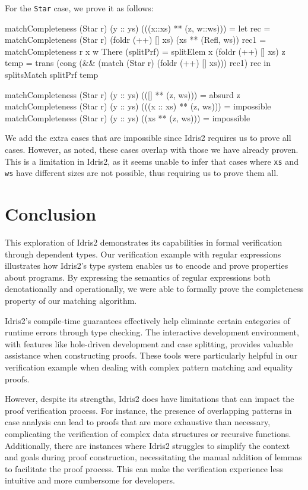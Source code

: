 \documentclass[]{rptuseminar}
\begin{document}
For the \texttt{Star} case, we prove it as follows:

\begin{idris}
matchCompleteness (Star r) (y :: ys) (((x::xs) ** (z, w::ws))) = 
    let rec = matchCompleteness (Star r) (foldr (++) [] xs) (xs ** (Refl, ws))
        rec1 = matchCompleteness r x w
        There (splitPrf) = splitElem x (foldr (++) [] xs) z
        temp = trans (cong (&& (match (Star r) (foldr (++) [] xs))) rec1) rec
    in splitsMatch splitPrf temp 

matchCompleteness (Star r) (y :: ys) (([] ** (z, ws))) = absurd z
matchCompleteness (Star r) (y :: ys) (((x :: xs) ** (z, ws))) = impossible
matchCompleteness (Star r) (y :: ys) ((xs ** (z, ws))) = impossible
\end{idris}

We add the extra cases that are impossible since Idris2 requires us to prove all cases. However, as noted, these cases overlap with those we have already proven. This is a limitation in Idris2, as it seems unable to infer that cases where \texttt{xs} and \texttt{ws} have different sizes are not possible, thus requiring us to prove them all.

\section{Conclusion}  
\label{sec:conclusion}  

This exploration of Idris2 demonstrates its capabilities in formal verification through dependent types. Our verification example with regular expressions illustrates how Idris2's type system enables us to encode and prove properties about programs. By expressing the semantics of regular expressions both denotationally and operationally, we were able to formally prove the completeness property of our matching algorithm.

Idris2's compile-time guarantees effectively help eliminate certain categories of runtime errors through type checking. The interactive development environment, with features like hole-driven development and case splitting, provides valuable assistance when constructing proofs. These tools were particularly helpful in our verification example when dealing with complex pattern matching and equality proofs.

However, despite its strengths, Idris2 does have limitations that can impact the proof verification process. For instance, the presence of overlapping patterns in case analysis can lead to proofs that are more exhaustive than necessary, complicating the verification of complex data structures or recursive functions. Additionally, there are instances where Idris2 struggles to simplify the context and goals during proof construction, necessitating the manual addition of lemmas to facilitate the proof process. This can make the verification experience less intuitive and more cumbersome for developers.
\end{document}
